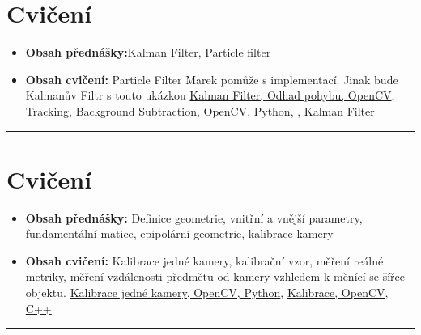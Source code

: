 \documentclass[12pt, a4paper]{article}
\begin{document}
\section{Cvičení}
\begin{itemize}
	\item \par{\textbf{Obsah přednášky:}Kalman Filter, Particle filter}
	\item \par{\textbf{Obsah cvičení:} {\color{red} Particle Filter Marek pomůže s implementací.} Jinak bude Kalmanův Filtr s touto ukázkou \href{http://www.morethantechnical.com/2011/06/17/simple-kalman-filter-for-tracking-using-opencv-2-2-w-code/}{Kalman Filter, Odhad pohybu, OpenCV}, \href{http://www.hdm-stuttgart.de/~maucher/Python/ComputerVision/html/Tracking.html}{Tracking, Background Subtraction, OpenCV, Python}, , \href{http://jayrambhia.wordpress.com/2012/07/26/kalman-filter/}{Kalman Filter}}
\end{itemize}
\noindent\rule[0.5ex]{\linewidth}{0.4pt}













\section{Cvičení}
\begin{itemize}
	\item \par{\textbf{Obsah přednášky:} Definice geometrie, vnitřní a vnější parametry, fundamentální matice, epipolární geometrie, kalibrace kamery}
	\item \par{\textbf{Obsah cvičení:} Kalibrace jedné kamery, kalibrační vzor, měření reálné metriky, měření vzdálenosti předmětu od kamery vzhledem k měnící se šířce objektu. \href{http://opencv-python-tutroals.readthedocs.org/en/latest/py_tutorials/py_calib3d/py_calibration/py_calibration.html}{Kalibrace jedné kamery, OpenCV, Python}, \href{http://docs.opencv.org/doc/tutorials/calib3d/camera_calibration/camera_calibration.html}{Kalibrace, OpenCV, C++}}
\end{itemize}
\noindent\rule[0.5ex]{\linewidth}{0.4pt}
\end{document}
